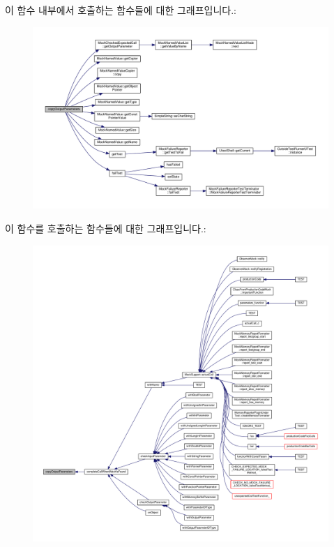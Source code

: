 이 함수 내부에서 호출하는 함수들에 대한 그래프입니다.\+:
\nopagebreak
\begin{figure}[H]
\begin{center}
\leavevmode
\includegraphics[width=350pt]{class_mock_checked_actual_call_a36356ef39dd2664152f94d6843c45365_cgraph}
\end{center}
\end{figure}




이 함수를 호출하는 함수들에 대한 그래프입니다.\+:
\nopagebreak
\begin{figure}[H]
\begin{center}
\leavevmode
\includegraphics[width=350pt]{class_mock_checked_actual_call_a36356ef39dd2664152f94d6843c45365_icgraph}
\end{center}
\end{figure}


